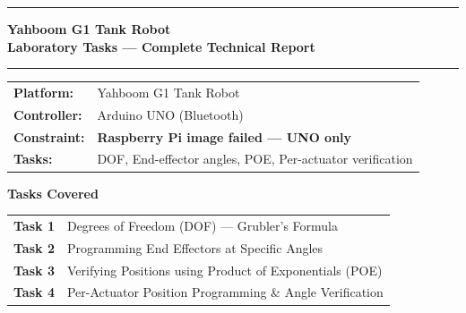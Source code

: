 \documentclass[12pt,a4paper]{article}
\begin{document}

\begin{titlepage}
  \centering
  \vspace*{2cm}

  {\color{PrimaryBlue}\rule{\linewidth}{2pt}}
  \vspace{0.5cm}

  {\color{PrimaryBlue}\Huge\bfseries Yahboom G1 Tank Robot\\[0.4em]
   \color{MidBlue}\Large Laboratory Tasks --- Complete Technical Report}

  \vspace{0.5cm}
  {\color{PrimaryBlue}\rule{\linewidth}{2pt}}

  \vspace{1.5cm}

  \begin{tcolorbox}[
    colback=VeryLightBlue,colframe=MidBlue,
    boxrule=1pt,arc=6pt,
    left=16pt,right=16pt,top=12pt,bottom=12pt,
    width=0.85\linewidth
  ]
  \centering
  \begin{tabular}{ll}
    \textbf{Platform:}    & Yahboom G1 Tank Robot \\[4pt]
    \textbf{Controller:}  & Arduino UNO (Bluetooth) \\[4pt]
    \textbf{Constraint:}  & \color{DangerRed}\bfseries Raspberry Pi image failed --- UNO only \\[4pt]
    \textbf{Tasks:}       & DOF, End-effector angles, POE, Per-actuator verification \\
  \end{tabular}
  \end{tcolorbox}

  \vspace{1.5cm}

  {\large\bfseries\color{PrimaryBlue} Tasks Covered}\\[0.6em]
  \begin{tabular}{cl}
    \rowcolor{LightBlue!50}
    \textbf{Task 1} & Degrees of Freedom (DOF) --- Grubler's Formula \\
    \textbf{Task 2} & Programming End Effectors at Specific Angles \\
    \rowcolor{LightBlue!50}
    \textbf{Task 3} & Verifying Positions using Product of Exponentials (POE) \\
    \textbf{Task 4} & Per-Actuator Position Programming \& Angle Verification \\
  \end{tabular}


\end{titlepage}
\end{document}
